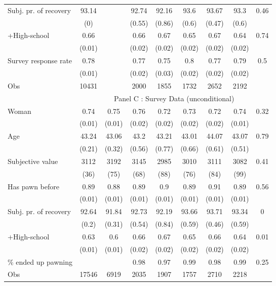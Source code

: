 \begin{tabular}{lcccccccc}
Subj. pr. of recovery & 93.14 &       & 92.74 & 92.16 & 93.6  & 93.67 & 93.3  & 0.46 \\
      & (0)   &       & (0.55) & (0.86) & (0.6) & (0.47) & (0.6) &  \\
+High-school & 0.66  &       & 0.66  & 0.67  & 0.65  & 0.67  & 0.64  & 0.74 \\
      & (0.01) &       & (0.02) & (0.02) & (0.02) & (0.02) & (0.02) &  \\
Survey response rate & 0.78  &       & 0.77  & 0.75  & 0.8   & 0.77  & 0.79  & 0.5 \\
      & (0.01) &       & (0.02) & (0.03) & (0.02) & (0.02) & (0.02) &  \\
\midrule
Obs   & 10431 &       & 2000  & 1855  & 1732  & 2652  & 2192  &  \\
\midrule
\midrule
      & \multicolumn{8}{c}{Panel C : Survey Data (unconditional)} \\
\midrule
\midrule
Woman & 0.74  & 0.75  & 0.76  & 0.72  & 0.73  & 0.72  & 0.74  & 0.32 \\
      & (0.01) & (0.01) & (0.02) & (0.02) & (0.02) & (0.02) & (0.01) &  \\
Age   & 43.24 & 43.06 & 43.2  & 43.21 & 43.01 & 44.07 & 43.07 & 0.79 \\
      & (0.21) & (0.32) & (0.56) & (0.77) & (0.66) & (0.61) & (0.51) &  \\
Subjective value & 3112  & 3192  & 3145  & 2985  & 3010  & 3111  & 3082  & 0.41 \\
      & (36)  & (75)  & (68)  & (88)  & (76)  & (84)  & (99)  &  \\
Has pawn before & 0.89  & 0.88  & 0.89  & 0.9   & 0.89  & 0.91  & 0.89  & 0.56 \\
      & (0.01) & (0.01) & (0.01) & (0.01) & (0.01) & (0.01) & (0.01) &  \\
Subj. pr. of recovery & 92.64 & 91.84 & 92.73 & 92.19 & 93.66 & 93.71 & 93.34 & 0 \\
      & (0.2) & (0.31) & (0.54) & (0.84) & (0.59) & (0.46) & (0.59) &  \\
+High-school & 0.63  & 0.6   & 0.66  & 0.67  & 0.65  & 0.66  & 0.64  & 0.01 \\
      & (0.01) & (0.01) & (0.02) & (0.02) & (0.02) & (0.02) & (0.02) &  \\
\% ended up pawning &       &       & 0.98  & 0.97  & 0.99  & 0.98  & 0.99  & 0.25 \\
\midrule
Obs   & 17546 & 6919  & 2035  & 1907  & 1757  & 2710  & 2218  &  \\
\bottomrule
\bottomrule
\end{tabular}%
